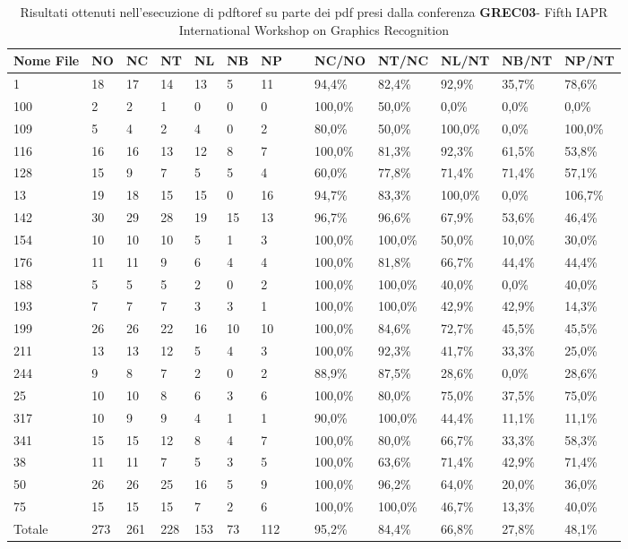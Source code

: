 	\begin{table}\label{tab:grec}
	\begin{center}
	\begin{tabular}{|l|l|l|l|l|l|l|l|l|l|l|l|l|} \hline
Nome File & NO & NC & NT & NL & NB & NP & ~ & NC/NO & NT/NC & NL/NT & NB/NT & NP/NT \\ \hline
1 & 18 & 17 & 14 & 13 & 5 & 11 & ~ & 94,4\% & 82,4\% & 92,9\% & 35,7\% & 78,6\%\\
100 & 2 & 2 & 1 & 0 & 0 & 0 & ~ & 100,0\% & 50,0\% & 0,0\% & 0,0\% & 0,0\%\\
109 & 5 & 4 & 2 & 4 & 0 & 2 & ~ & 80,0\% & 50,0\% & 100,0\% & 0,0\% & 100,0\%\\
116 & 16 & 16 & 13 & 12 & 8 & 7 & ~ & 100,0\% & 81,3\% & 92,3\% & 61,5\% & 53,8\%\\
128 & 15 & 9 & 7 & 5 & 5 & 4 & ~ & 60,0\% & 77,8\% & 71,4\% & 71,4\% & 57,1\%\\
13 & 19 & 18 & 15 & 15 & 0 & 16 & ~ & 94,7\% & 83,3\% & 100,0\% & 0,0\% & 106,7\%\\
142 & 30 & 29 & 28 & 19 & 15 & 13 & ~ & 96,7\% & 96,6\% & 67,9\% & 53,6\% & 46,4\%\\
154 & 10 & 10 & 10 & 5 & 1 & 3 & ~ & 100,0\% & 100,0\% & 50,0\% & 10,0\% & 30,0\%\\
176 & 11 & 11 & 9 & 6 & 4 & 4 & ~ & 100,0\% & 81,8\% & 66,7\% & 44,4\% & 44,4\%\\
188 & 5 & 5 & 5 & 2 & 0 & 2 & ~ & 100,0\% & 100,0\% & 40,0\% & 0,0\% & 40,0\%\\
193 & 7 & 7 & 7 & 3 & 3 & 1 & ~ & 100,0\% & 100,0\% & 42,9\% & 42,9\% & 14,3\%\\
199 & 26 & 26 & 22 & 16 & 10 & 10 & ~ & 100,0\% & 84,6\% & 72,7\% & 45,5\% & 45,5\%\\
211 & 13 & 13 & 12 & 5 & 4 & 3 & ~ & 100,0\% & 92,3\% & 41,7\% & 33,3\% & 25,0\%\\
244 & 9 & 8 & 7 & 2 & 0 & 2 & ~ & 88,9\% & 87,5\% & 28,6\% & 0,0\% & 28,6\%\\
25 & 10 & 10 & 8 & 6 & 3 & 6 & ~ & 100,0\% & 80,0\% & 75,0\% & 37,5\% & 75,0\%\\
317 & 10 & 9 & 9 & 4 & 1 & 1 & ~ & 90,0\% & 100,0\% & 44,4\% & 11,1\% & 11,1\%\\
341 & 15 & 15 & 12 & 8 & 4 & 7 & ~ & 100,0\% & 80,0\% & 66,7\% & 33,3\% & 58,3\%\\
38 & 11 & 11 & 7 & 5 & 3 & 5 & ~ & 100,0\% & 63,6\% & 71,4\% & 42,9\% & 71,4\%\\
50 & 26 & 26 & 25 & 16 & 5 & 9 & ~ & 100,0\% & 96,2\% & 64,0\% & 20,0\% & 36,0\%\\
75 & 15 & 15 & 15 & 7 & 2 & 6 & ~ & 100,0\% & 100,0\% & 46,7\% & 13,3\% & 40,0\%\\ \hline
Totale & 273 & 261 & 228 & 153 & 73 & 112 & ~ & 95,2\% & 84,4\% & 66,8\% & 27,8\% & 48,1\%\\ \hline
	\end{tabular}
	\tiny{\caption{Risultati ottenuti nell'esecuzione di pdftoref su parte dei pdf presi dalla conferenza \textbf{GREC03}- Fifth IAPR International Workshop on Graphics Recognition}}
	\end{center}
	\end{table}
	

